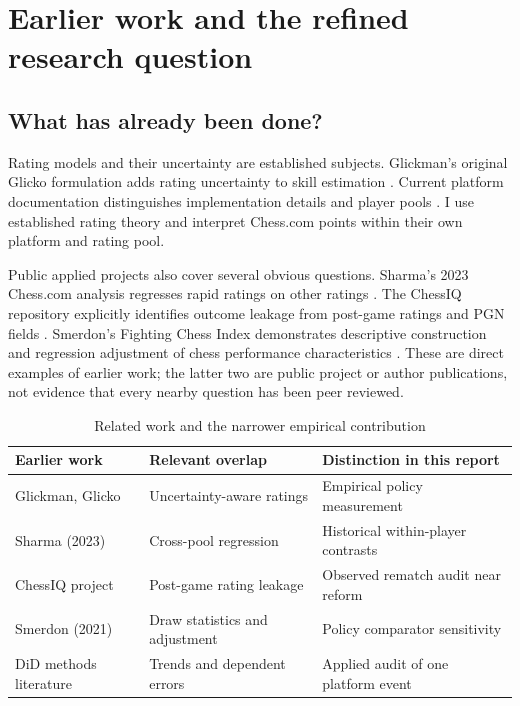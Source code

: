 \documentclass[11pt,a4paper]{article}
\begin{document}
\section{Earlier work and the refined research question}

\subsection{What has already been done?}

Rating models and their uncertainty are established subjects. Glickman's original Glicko formulation adds rating uncertainty to skill estimation \cite{glicko}. Current platform documentation distinguishes implementation details and player pools \cite{chessratings,lichessratings}. I use established rating theory and interpret Chess.com points within their own platform and rating pool.

Public applied projects also cover several obvious questions. Sharma's 2023 Chess.com analysis regresses rapid ratings on other ratings \cite{sharma}. The ChessIQ repository explicitly identifies outcome leakage from post-game ratings and PGN fields \cite{chessiq}. Smerdon's Fighting Chess Index demonstrates descriptive construction and regression adjustment of chess performance characteristics \cite{smerdon}. These are direct examples of earlier work; the latter two are public project or author publications, not evidence that every nearby question has been peer reviewed.

\begin{table}[H]\centering\small\caption{Related work and the narrower empirical contribution}\begin{tabular}{p{3cm}p{4.1cm}p{6cm}}\toprule

Earlier work & Relevant overlap & Distinction in this report \\ \midrule

Glickman, Glicko & Uncertainty-aware ratings & Empirical policy measurement \\

Sharma (2023) & Cross-pool regression & Historical within-player contrasts \\

ChessIQ project & Post-game rating leakage & Observed rematch audit near reform \\

Smerdon (2021) & Draw statistics and adjustment & Policy comparator sensitivity \\

DiD methods literature & Trends and dependent errors & Applied audit of one platform event \\

\bottomrule\end{tabular}\end{table}
\end{document}
